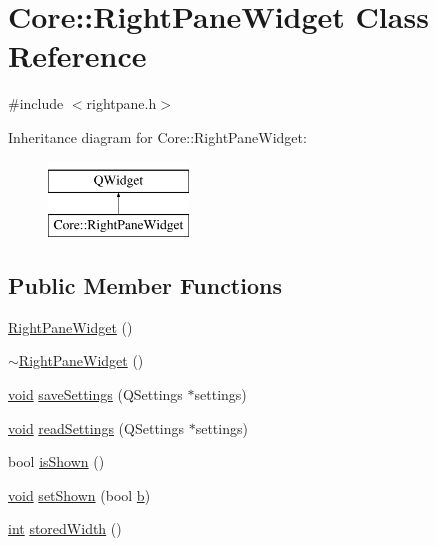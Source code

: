 \hypertarget{class_core_1_1_right_pane_widget}{\section{Core\-:\-:Right\-Pane\-Widget Class Reference}
\label{class_core_1_1_right_pane_widget}
}


{\ttfamily \#include $<$rightpane.\-h$>$}

Inheritance diagram for Core\-:\-:Right\-Pane\-Widget\-:\begin{figure}[H]
\begin{center}
\leavevmode
\includegraphics[height=2.000000cm]{class_core_1_1_right_pane_widget}
\end{center}
\end{figure}
\subsection*{Public Member Functions}
\begin{DoxyCompactItemize}
\item 
\hyperlink{group___core_plugin_ga2bbb7af201a89caebcb2e5471281fc2b}{Right\-Pane\-Widget} ()
\item 
\hyperlink{group___core_plugin_ga9cb94bea3853dcdec59955cd18d0f46e}{$\sim$\-Right\-Pane\-Widget} ()
\item 
\hyperlink{group___u_a_v_objects_plugin_ga444cf2ff3f0ecbe028adce838d373f5c}{void} \hyperlink{group___core_plugin_ga6aba4fa76241735657bafa8c91ca693a}{save\-Settings} (Q\-Settings $\ast$settings)
\item 
\hyperlink{group___u_a_v_objects_plugin_ga444cf2ff3f0ecbe028adce838d373f5c}{void} \hyperlink{group___core_plugin_gaf1304ad39d57b1676619c48b3cc36a2f}{read\-Settings} (Q\-Settings $\ast$settings)
\item 
bool \hyperlink{group___core_plugin_gaad9c682c9e0a6faa781729d99a0befd3}{is\-Shown} ()
\item 
\hyperlink{group___u_a_v_objects_plugin_ga444cf2ff3f0ecbe028adce838d373f5c}{void} \hyperlink{group___core_plugin_gae2bff06b92d12fc02f0b0dfec96172fb}{set\-Shown} (bool \hyperlink{glext_8h_a6eba317e3cf44d6d26c04a5a8f197dcb}{b})
\item 
\hyperlink{ioapi_8h_a787fa3cf048117ba7123753c1e74fcd6}{int} \hyperlink{group___core_plugin_ga4e4da9893129784bcc148d4b18d852ae}{stored\-Width} ()
\end{DoxyCompactItemize}
